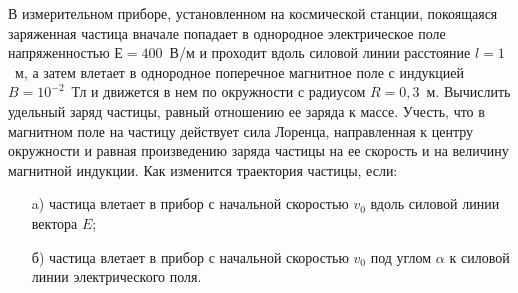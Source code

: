 
В измерительном приборе, установленном на космической станции, покоящаяся заряженная частица вначале 
попадает в однородное электрическое поле напряженностью $Е=400$~В/м и проходит вдоль силовой линии 
расстояние $l=1$~м,  а затем влетает в однородное поперечное магнитное поле с индукцией $B=10^{-2}$~Тл и 
движется в нем по окружности с радиусом $R=0,3$~м. Вычислить удельный заряд частицы, равный отношению ее заряда к массе. 
Учесть, что в магнитном поле на частицу действует сила Лоренца, направленная к центру окружности и равная 
произведению заряда частицы на ее скорость и на величину магнитной индукции. Как изменится траектория частицы, если:

\begin{enumerate}
    \item[a)] частица влетает в прибор с начальной скоростью $v_0$ вдоль силовой линии вектора $E$;
    \item[б)] частица влетает в прибор с начальной скоростью $v_0$ под углом $\alpha$ к силовой линии электрического поля.
\end{enumerate}